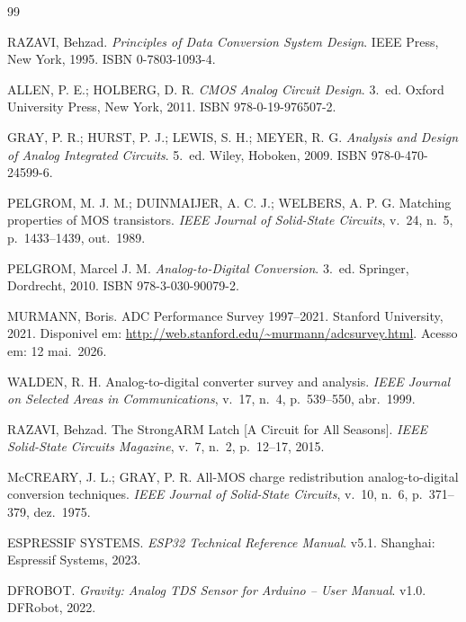 \documentclass[12pt, a4paper]{article}
\begin{document}
\renewcommand{\refname}{Referencias Bibliograficas}
\begin{thebibliography}{99}

RAZAVI, Behzad.
\textit{Principles of Data Conversion System Design}.
IEEE Press, New York, 1995. ISBN 0-7803-1093-4.

ALLEN, P. E.; HOLBERG, D. R.
\textit{CMOS Analog Circuit Design}.
3.~ed. Oxford University Press, New York, 2011. ISBN 978-0-19-976507-2.

GRAY, P. R.; HURST, P. J.; LEWIS, S. H.; MEYER, R. G.
\textit{Analysis and Design of Analog Integrated Circuits}.
5.~ed. Wiley, Hoboken, 2009. ISBN 978-0-470-24599-6.

PELGROM, M. J. M.; DUINMAIJER, A. C. J.; WELBERS, A. P. G.
Matching properties of MOS transistors.
\textit{IEEE Journal of Solid-State Circuits}, v.~24, n.~5, p.~1433--1439, out.\ 1989.

PELGROM, Marcel J. M.
\textit{Analog-to-Digital Conversion}.
3.~ed. Springer, Dordrecht, 2010. ISBN 978-3-030-90079-2.

MURMANN, Boris.
ADC Performance Survey 1997--2021.
Stanford University, 2021.
Disponivel em: \url{http://web.stanford.edu/~murmann/adcsurvey.html}.
Acesso em: 12 mai.\ 2026.

WALDEN, R. H.
Analog-to-digital converter survey and analysis.
\textit{IEEE Journal on Selected Areas in Communications},
v.~17, n.~4, p.~539--550, abr.\ 1999.

RAZAVI, Behzad.
The StrongARM Latch [A Circuit for All Seasons].
\textit{IEEE Solid-State Circuits Magazine}, v.~7, n.~2, p.~12--17, 2015.

McCREARY, J. L.; GRAY, P. R.
All-MOS charge redistribution analog-to-digital conversion techniques.
\textit{IEEE Journal of Solid-State Circuits}, v.~10, n.~6, p.~371--379, dez.\ 1975.

ESPRESSIF SYSTEMS.
\textit{ESP32 Technical Reference Manual}. v5.1.
Shanghai: Espressif Systems, 2023.

DFROBOT.
\textit{Gravity: Analog TDS Sensor for Arduino -- User Manual}. v1.0. DFRobot, 2022.


\end{thebibliography}
\end{document}
